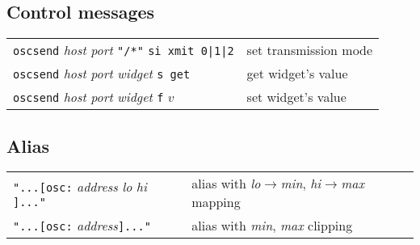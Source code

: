 \subsection*{Control messages}

\begin{tabular}{ll}
\lstinline'oscsend' \emph{host} \emph{port} \lstinline'"/*"' \lstinline'si xmit 0|1|2' & set transmission mode \\
\lstinline'oscsend' \emph{host} \emph{port} \emph{widget} \lstinline's get' & get widget's value \\
\lstinline'oscsend' \emph{host} \emph{port} \emph{widget} \lstinline'f' $v$ & set widget's value
\end{tabular}

\subsection*{Alias}

\begin{tabular}{ll}
\lstinline'"...[osc:' \emph{address}  \emph{lo}  \emph{hi} \lstinline']..."' & alias with \emph{lo}$\rightarrow$\emph{min}, \emph{hi}$\rightarrow$\emph{max} mapping\\
\lstinline'"...[osc:' \emph{address}\lstinline']..."' & alias with \emph{min}, \emph{max} clipping
\end{tabular}

